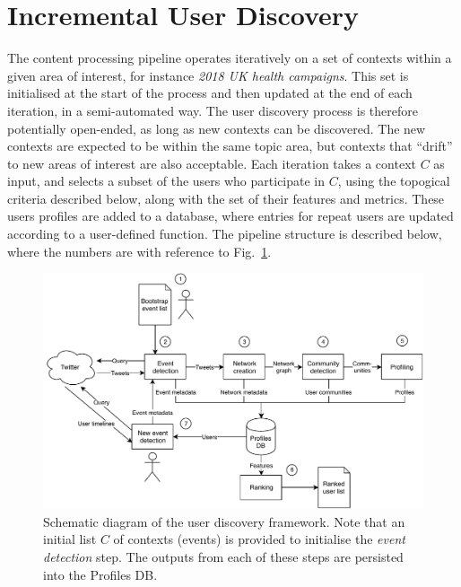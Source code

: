 \section{Incremental User Discovery} \label{sec:Pipeline}
	
The content processing pipeline operates iteratively on a set of contexts within a given area of interest, for instance \textit{2018 UK health campaigns}. This set is initialised at the start of the process and then updated at the end of each iteration, in a semi-automated way. 
The user discovery process is therefore potentially open-ended, as long as new contexts can be discovered.
The new contexts are expected to be within the same topic area, but contexts that ``drift'' to new areas of interest are also acceptable. 
Each iteration takes a context $C$  as input, and selects a subset of the users who participate in $C$, using the topogical criteria described below, along with the  set of their features and metrics. 
These users profiles are added to a database, where entries for repeat users are updated according to a user-defined function. 
%
The pipeline structure is described below, where the numbers are with reference to Fig.~\ref{fig:twitterframework}.

\begin{figure}
	\centering
	\includegraphics[width=\textwidth]{figures/TwitterFramework}
	\caption{Schematic diagram of the user discovery framework. Note that an initial list $C$ of contexts (events) is provided to initialise the \textit{event detection} step. 
	The outputs from each of these steps are persisted into the Profiles DB.}
	\label{fig:twitterframework}
\end{figure}

